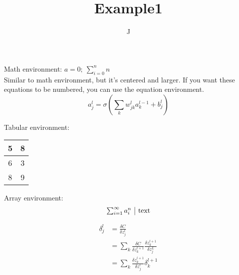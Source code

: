 \documentclass[12pt]{amsart}
\begin{document}
\title[Short Title]{Example1}
\author{J} \maketitle

Math environment:
$a = 0;\ \sum_{i = 0}^n n$\\

Similar to math environment, but it's centered and larger. If you want these
equations to be numbered, you can use the equation environment.
$$a_j^l = \sigma \left( \sum_k w_{j k}^l a_k^{l - 1} + b_j^l \right)$$

Tabular environment:\\
\begin{tabular}{| c | c |}
\hline
5 & 8\\
\hline
6 & 3\\
\hline
8 & 9\\
\hline
\end{tabular}

Array environment:\\
$$
\begin{array}{c | c}
\sum_{i = 1}^\infty a_i^n & \text{text}\\
\end{array}
$$

\begin{align*}
\delta_j^l &= \frac{\delta C}{\delta z_j^l}\\
&= \sum_k \frac{\delta C}{\delta z_k^{l + 1}} \frac{\delta z_k^{l + 1}}{\delta z_j^L}\\
&= \sum_k \frac{\delta z_k^{l + 1}}{\delta z_j^l} \delta_k^{l + 1}\\
\end{align*}
\end{document}
